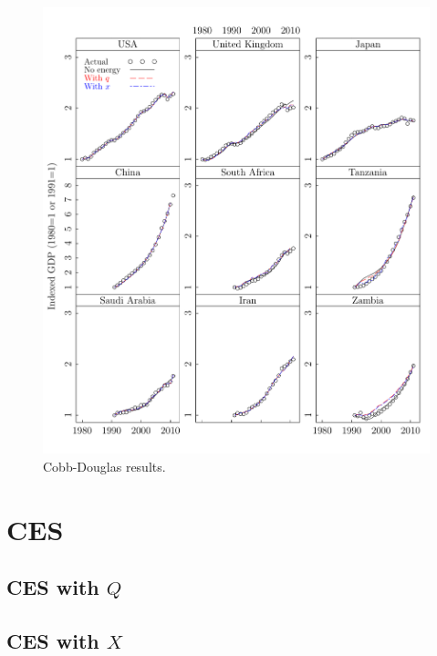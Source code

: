 \documentclass[preprint,authoryear,12pt]{elsarticle}\usepackage{graphicx, color}
\makeatletter
\def\maxwidth{ %
  \ifdim\Gin@nat@width>\linewidth
    \linewidth
  \else
    \Gin@nat@width
  \fi
}
\newenvironment{knitrout}{}{} %
\makeatother
\begin{document}
\begin{knitrout}
\color{fgcolor}\begin{figure}[]

\includegraphics[width=\maxwidth]{figure/CD_GDP_Lattice_Graph} \caption[Cobb-Douglas results]{Cobb-Douglas results.\label{fig:CD_GDP_Lattice_Graph}}
\end{figure}


\end{knitrout}


\section{CES}




\subsection{CES with $Q$}






\subsection{CES with $X$}
\end{document}
